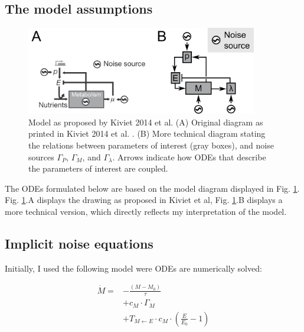 \documentclass[a4paper,twoside,10pt]{report}
\begin{document}
\subsection{The model assumptions}

\begin{figure}
    \centering
    \includegraphics[width=0.9\textwidth]{./drawings_png/model_nghe.png}
    \caption{Model as proposed by Kiviet 2014 et al. 
        (A) Original diagram as printed in Kiviet 2014 et al. \cite{Kiviet2014}.
        (B) More technical diagram stating the relations between parameters of interest (gray boxes), and noise sources $\Gamma_P$, $\Gamma_M$, and $\Gamma_\lambda$. Arrows indicate how ODEs that describe the parameters of interest are coupled.
        }
    \label{fig:modeldrawing}
\end{figure}

The ODEs formulated below are based on the model diagram displayed in Fig. \ref{fig:modeldrawing}. Fig. \ref{fig:modeldrawing}.A displays the drawing as proposed in Kiviet et al, Fig. \ref{fig:modeldrawing}.B displays a more technical version, which directly reflects my interpretation of the model.

\subsection{Implicit noise equations}

Initially, I used the following model were ODEs are numerically solved:

\begin{align}
\label{myfirstequation}
\dot{M} = & - \frac{(M-M_0)}{\tau}  \nonumber \\ 
          & + c_M \cdot \Gamma_M  \nonumber \\ %
          & + T_{M\leftarrow E} \cdot c_M \cdot (\frac{E}{E_0} - 1)  
\end{align}
\end{document}
